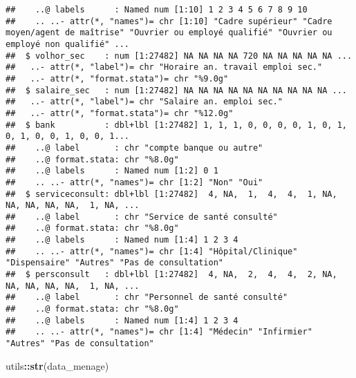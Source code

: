 \documentclass[
]{article}
\newenvironment{Shaded}{\begin{snugshade}}{\end{snugshade}}
\newcommand{\FunctionTok}[1]{\textcolor[rgb]{0.13,0.29,0.53}{\textbf{#1}}}
\newcommand{\NormalTok}[1]{#1}
\newcommand{\SpecialCharTok}[1]{\textcolor[rgb]{0.81,0.36,0.00}{\textbf{#1}}}
\begin{document}
\begin{verbatim}
##    ..@ labels      : Named num [1:10] 1 2 3 4 5 6 7 8 9 10
##    .. ..- attr(*, "names")= chr [1:10] "Cadre supérieur" "Cadre moyen/agent de maîtrise" "Ouvrier ou employé qualifié" "Ouvrier ou employé non qualifié" ...
##  $ volhor_sec    : num [1:27482] NA NA NA NA 720 NA NA NA NA NA ...
##   ..- attr(*, "label")= chr "Horaire an. travail emploi sec."
##   ..- attr(*, "format.stata")= chr "%9.0g"
##  $ salaire_sec   : num [1:27482] NA NA NA NA NA NA NA NA NA NA ...
##   ..- attr(*, "label")= chr "Salaire an. emploi sec."
##   ..- attr(*, "format.stata")= chr "%12.0g"
##  $ bank          : dbl+lbl [1:27482] 1, 1, 1, 0, 0, 0, 0, 1, 0, 1, 0, 1, 0, 0, 1, 0, 0, 1...
##    ..@ label       : chr "compte banque ou autre"
##    ..@ format.stata: chr "%8.0g"
##    ..@ labels      : Named num [1:2] 0 1
##    .. ..- attr(*, "names")= chr [1:2] "Non" "Oui"
##  $ serviceconsult: dbl+lbl [1:27482]  4, NA,  1,  4,  4,  1, NA, NA, NA, NA, NA,  1, NA, ...
##    ..@ label       : chr "Service de santé consulté"
##    ..@ format.stata: chr "%8.0g"
##    ..@ labels      : Named num [1:4] 1 2 3 4
##    .. ..- attr(*, "names")= chr [1:4] "Hôpital/Clinique" "Dispensaire" "Autres" "Pas de consultation"
##  $ persconsult   : dbl+lbl [1:27482]  4, NA,  2,  4,  4,  2, NA, NA, NA, NA, NA,  1, NA, ...
##    ..@ label       : chr "Personnel de santé consulté"
##    ..@ format.stata: chr "%8.0g"
##    ..@ labels      : Named num [1:4] 1 2 3 4
##    .. ..- attr(*, "names")= chr [1:4] "Médecin" "Infirmier" "Autres" "Pas de consultation"
\end{verbatim}

\begin{Shaded}
\begin{Highlighting}[]
\NormalTok{utils}\SpecialCharTok{::}\FunctionTok{str}\NormalTok{(data\_menage)}
\end{Highlighting}
\end{Shaded}
\end{document}
